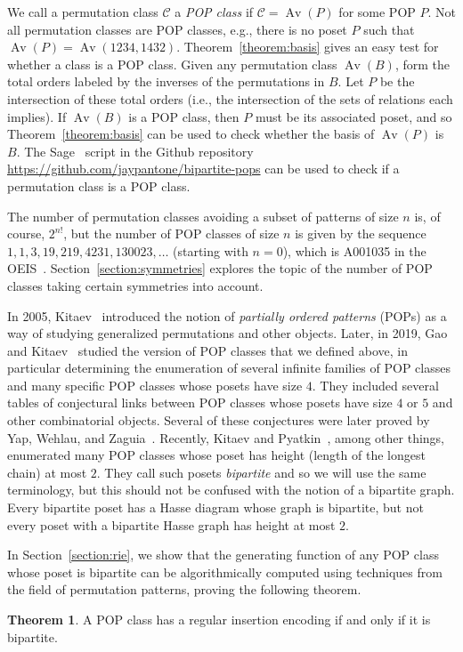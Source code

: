 \documentclass[11pt]{article}
\theoremstyle{definition}
\newtheorem{theorem}{Theorem}
\numberwithin{theorem}{section}
\numberwithin{question}{section}
\numberwithin{definition}{section}
\numberwithin{example}{section}
\numberwithin{remark}{section}
\newcommand{\Av}{\operatorname{Av}}
\newcommand{\CC}{\mathcal{C}}
\begin{document}
We call a permutation class $\CC$ a \emph{POP class} if $\CC = \Av(P)$ for some POP $P$. Not all permutation classes are POP classes, e.g., there is no poset $P$ such that $\Av(P) = \Av(1234, 1432)$. Theorem~\ref{theorem:basis} gives an easy test for whether a class is a POP class. Given any permutation class $\Av(B)$, form the total orders labeled by the inverses of the permutations in $B$. Let $P$ be the intersection of these total orders (i.e., the intersection of the sets of relations each implies). If $\Av(B)$ is a POP class, then $P$ must be its associated poset, and so Theorem~\ref{theorem:basis} can be used to check whether the basis of $\Av(P)$ is $B$. The Sage~\cite{sage} script in the Github repository \url{https://github.com/jaypantone/bipartite-pops} can be used to check if a permutation class is a POP class.

The number of permutation classes avoiding a subset of patterns of size $n$ is, of course, $2^{n!}$, but the number of POP classes of size $n$ is given by the sequence $1, 1, 3, 19, 219, 4231, 130023, \ldots$ (starting with $n=0$), which is A001035 in the OEIS~\cite{oeis}. Section~\ref{section:symmetries} explores the topic of the number of POP classes taking certain symmetries into account.

In 2005, Kitaev~\cite{kitaev:OG-pop} introduced the notion of \emph{partially ordered patterns} (POPs) as a way of studying generalized permutations and other objects. Later, in 2019, Gao and Kitaev~\cite{gao:partially-ordered-patterns} studied the version of POP classes that we defined above, in particular determining the enumeration of several infinite families of POP classes and many specific POP classes whose posets have size $4$. They included several tables of conjectural links between POP classes whose posets have size $4$ or $5$ and other combinatorial objects.  Several of these conjectures were later proved by Yap, Wehlau, and Zaguia~\cite{yap:pops}. Recently, Kitaev and Pyatkin~\cite{kitaev:pop2}, among other things, enumerated many POP classes whose poset has height (length of the longest chain) at most $2$. They call such posets \emph{bipartite} and so we will use the same terminology, but this should not be confused with the notion of a bipartite graph. Every bipartite poset has a Hasse diagram whose graph is bipartite, but not every poset with a bipartite Hasse graph has height at most $2$.

In Section~\ref{section:rie}, we show that the generating function of any POP class whose poset is bipartite can be algorithmically computed using techniques from the field of permutation patterns, proving the following theorem.
\begin{theorem}
	\label{theorem:rie}
	A POP class has a regular insertion encoding if and only if it is bipartite.
\end{theorem}
\end{document}
